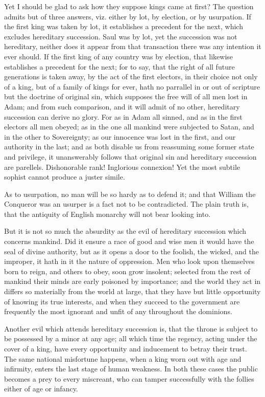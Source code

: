 \documentclass[12pt,oneside]{memoir}
\begin{document}
Yet I should be glad to ask how they suppose kings came at first? The question admits but of three answers, viz. either by lot, by election, or by usurpation. If the first king was taken by lot, it establishes a precedent for the next, which excludes hereditary succession. Saul was by lot, yet the succession was not hereditary, neither does it appear from that transaction there was any intention it ever should. If the first king of any country was by election, that likewise establishes a precedent for the next; for to say, that the right of all future generations is taken away, by the act of the first electors, in their choice not only of a king, but of a family of kings for ever, hath no parrallel in or out of scripture but the doctrine of original sin, which supposes the free will of all men lost in Adam; and from such comparison, and it will admit of no other, hereditary succession can derive no glory. For as in Adam all sinned, and as in the first electors all men obeyed; as in the one all mankind were subjected to Satan, and in the other to Sovereignty; as our innocence was lost in the first, and our authority in the last; and as both disable us from reassuming some former state and privilege, it unanswerably follows that original sin and hereditary succession are parellels. Dishonorable rank! Inglorious connexion! Yet the most subtile sophist cannot produce a juster simile.

As to usurpation, no man will be so hardy as to defend it; and that William the Conqueror was an usurper is a fact not to be contradicted. The plain truth is, that the antiquity of English monarchy will not bear looking into.

But it is not so much the absurdity as the evil of hereditary succession which concerns mankind. Did it ensure a race of good and wise men it would have the seal of divine authority, but as it opens a door to the foolish, the wicked, and the improper, it hath in it the nature of oppression. Men who look upon themselves born to reign, and others to obey, soon grow insolent; selected from the rest of mankind their minds are early poisoned by importance; and the world they act in differs so materially from the world at large, that they have but little opportunity of knowing its true interests, and when they succeed to the government are frequently the most ignorant and unfit of any throughout the dominions.

Another evil which attends hereditary succession is, that the throne is subject to be possessed by a minor at any age; all which time the regency, acting under the cover of a king, have every opportunity and inducement to betray their trust. The same national misfortune happens, when a king worn out with age and infirmity, enters the last stage of human weakness. In both these cases the public becomes a prey to every miscreant, who can tamper successfully with the follies either of age or infancy.
\end{document}

